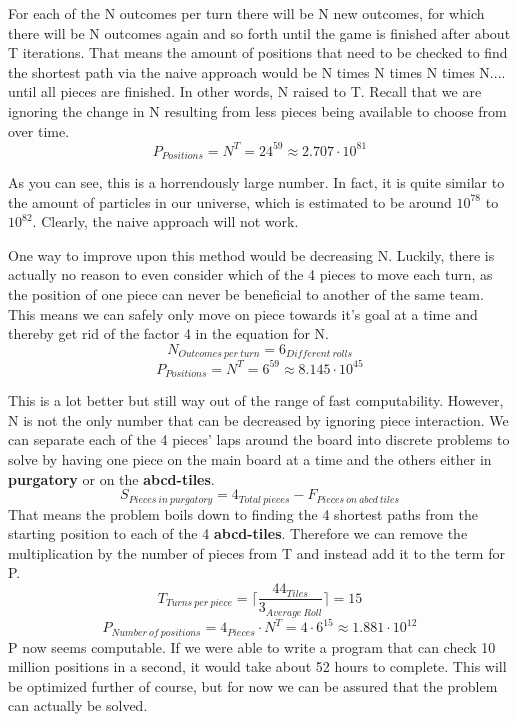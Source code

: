 \documentclass[12pt]{article}
\begin{document}
For each of the N outcomes per turn there will be N new outcomes, for which there will be N outcomes again and so forth until the game is finished after about T iterations. That means the amount of positions that need to be checked to find the shortest path via the naive approach would be N times N times N times N.... until all pieces are finished. In other words, N raised to T. Recall that we are ignoring the change in N resulting from less pieces being available to choose from over time.
\[
    P_{Positions} =  N^T = 24^{59} \approx 2.707 \cdot 10^{81}
\]

As you can see, this is a horrendously large number. In fact, it is quite similar to the amount of particles in our universe, which is estimated to be around $10^{78}$ to $10^{82}$. Clearly, the naive approach will not work.

One way to improve upon this method would be decreasing N. Luckily, there is actually no reason to even consider which of the 4 pieces to move each turn, as the position of one piece can never be beneficial to another of the same team. This means we can safely only move on piece towards it's goal at a time and thereby get rid of the factor 4 in the equation for N.
\[
    N_{Outcomes~per~turn} = 6_{Different~rolls}
\]
\[
    P_{Positions} =  N^T = 6^{59} \approx 8.145 \cdot 10^{45}
\]

This is a lot better but still way out of the range of fast computability.
However, N is not the only number that can be decreased by ignoring piece interaction. We can separate each of the 4 pieces' laps around the board into discrete problems to solve by having one piece on the main board at a time and the others either in \textbf{purgatory} or on the \textbf{abcd-tiles}.
\[
    S_{Pieces~ in~purgatory} = 4_{Total~ pieces} - F_{Pieces~ on~abcd~tiles}
\]
That means the problem boils down to finding the 4 shortest paths from the starting position to each of the 4 \textbf{abcd-tiles}.
Therefore we can remove the multiplication by the number of pieces from T and instead add it to the term for P.
\[
    T_{Turns~per~piece} =  \lceil \frac{44_{Tiles}}{3_{Average~Roll}}\rceil
    =  15
\]
\[
    P_{Number~of~positions} =  4_{Pieces} \cdot N^T = 4 \cdot 6^{15} \approx 1.881 \cdot 10^{12}
\]
P now seems computable. If we were able to write a program that can check 10 million positions in a second, it would take about
52 hours to complete. This will be optimized further of course, but for now we can be assured that the problem can actually be solved.
\end{document}
